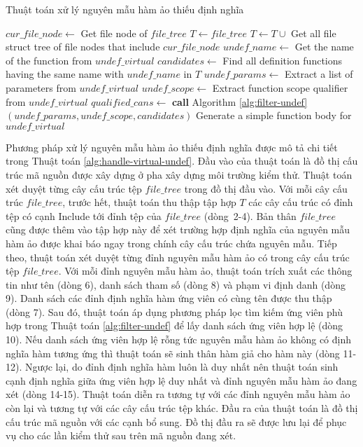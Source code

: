 \begin{algorithm}[t]
    \small
    \caption{Thuật toán xử lý nguyên mẫu hàm ảo thiếu định nghĩa}
    \label{alg:handle-virtual-undef}
     {
        $cur\_file\_node \leftarrow $ Get file node of $file\_tree$\;
        $T \leftarrow {file\_tree}$\;
        $T \leftarrow T \cup$ {Get all file struct tree of file nodes that include $cur\_file\_node$}\;
         {
            $undef\_name \leftarrow$ Get the name of the function from $undef\_virtual$\;
            $candidates \leftarrow$ Find all definition functions having the same name with $undef\_name$ in $T$\;
            $undef\_params \leftarrow$ Extract a list of parameters from $undef\_virtual$\;
            $undef\_scope\leftarrow$ Extract function scope qualifier from $undef\_virtual$\;
            $qualified\_cans\leftarrow$ \textbf{call} Algorithm \ref{alg:filter-undef} $(undef\_params, undef\_scope, candidates)$\;
             {
                Generate a simple function body for $undef\_virtual$\;
            }
        }
    }
\end{algorithm}

Phương pháp xử lý nguyên mẫu hàm ảo thiếu định nghĩa được mô tả chi tiết trong Thuật toán \ref{alg:handle-virtual-undef}. Đầu vào của thuật toán là đồ thị cấu trúc mã nguồn được xây dựng ở pha xây dựng môi trường kiểm thử. Thuật toán xét duyệt từng cây cấu trúc tệp $file\_tree$ trong đồ thị đầu vào. Với mỗi cây cấu trúc $file\_tree$, trước hết, thuật toán thu thập tập hợp $T$ các cây cấu trúc có đỉnh tệp có cạnh Include tới đỉnh tệp của $file\_tree$ (dòng~2-4). Bản thân $file\_tree$ cũng được thêm vào tập hợp này để xét trường hợp định nghĩa của nguyên mẫu hàm ảo được khai báo ngay trong chính cây cấu trúc chứa nguyên mẫu. Tiếp theo, thuật toán xét duyệt từng đỉnh nguyên mẫu hàm ảo có trong cây cấu trúc tệp $file\_tree$. Với mỗi đỉnh nguyên mẫu hàm ảo, thuật toán trích xuất các thông tin như tên (dòng 6), danh sách tham số (dòng 8) và phạm vi định danh (dòng 9). Danh sách các đỉnh định nghĩa hàm ứng viên có cùng tên được thu thập (dòng 7). Sau đó, thuật toán áp dụng phương pháp lọc tìm kiếm ứng viên phù hợp trong Thuật toán \ref{alg:filter-undef} để lấy danh sách ứng viên hợp lệ (dòng 10). Nếu danh sách ứng viên hợp lệ rỗng tức nguyên mẫu hàm ảo không có định nghĩa hàm tương ứng thì thuật toán sẽ sinh thân hàm giả cho hàm này (dòng 11-12). Ngược lại, do đỉnh định nghĩa hàm luôn là duy nhất nên thuật toán sinh cạnh định nghĩa giữa ứng viên hợp lệ duy nhất và đỉnh nguyên mẫu hàm ảo đang xét (dòng 14-15). Thuật toán diễn ra tương tự với các đỉnh nguyên mẫu hàm ảo còn lại và tương tự với các cây cấu trúc tệp khác. Đầu ra của thuật toán là đồ thị cấu trúc mã nguồn với các cạnh bổ sung. Đồ thị đầu ra sẽ được lưu lại để phục vụ cho các lần kiểm thử sau trên mã nguồn đang xét.

